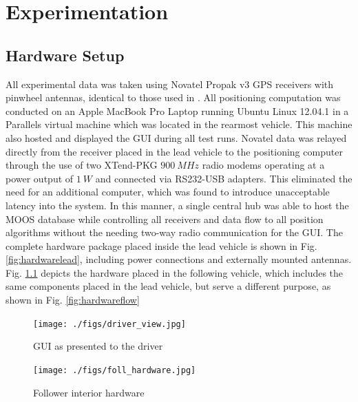 \chapter{Experimentation} \label{chap:exper}

\section{Hardware Setup} \label{sec:hardware}

All experimental data was taken using Novatel Propak v3 GPS receivers with pinwheel antennas, identical to those used in \cite{scottthesis}. All positioning computation was conducted on an Apple MacBook Pro Laptop running Ubuntu Linux 12.04.1 in a Parallels virtual machine which was located in the rearmost vehicle. This machine also hosted and displayed the GUI during all test runs. Novatel data was relayed directly from the receiver placed in the lead vehicle to the positioning computer through the use of two XTend-PKG $900~MHz$ radio modems operating at a power output of $1~W$ and connected via RS232-USB adapters. This eliminated the need for an additional computer, which was found to introduce unacceptable latency into the system. In this manner, a single central hub was able to host the MOOS database while controlling all receivers and data flow to all position algorithms without the needing two-way radio communication for the GUI. The complete hardware package placed inside the lead vehicle is shown in Fig. \ref{fig:hardwarelead}, including power connections and externally mounted antennas. Fig. \ref{fig:hardwarefoll} depicts the hardware placed in the following vehicle, which includes the same components placed in the lead vehicle, but serve a different purpose, as shown in Fig. \ref{fig:hardwareflow}

\begin{figure}[ht] \centering
    \begin{minipage}[b]{0.45\linewidth} \centering 
        \texttt{[image: ./figs/driver\_view.jpg]}
        \caption{GUI as presented to the driver} \label{fig:driverview}
    \end{minipage}
    \hspace{0.5cm}
    \begin{minipage}[b]{0.45\linewidth} \centering
        \texttt{[image: ./figs/foll\_hardware.jpg]}
        \caption{Follower interior hardware} \label{fig:hardwarefoll}
    \end{minipage}
\end{figure}

